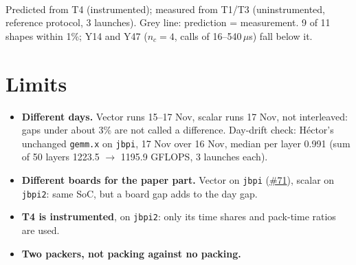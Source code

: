 \documentclass[10pt,a4paper]{article}
\newcommand{\iss}[1]{\href{https://github.com/JieGH/RVV_code_gen_via_MLIR_xDSL/issues/#1}{\##1}}
\begin{document}
\begin{center}
\\
{\footnotesize\color{muted} Predicted from T4 (instrumented); measured from T1/T3 (uninstrumented, reference protocol, 3 launches).
Grey line: prediction = measurement. 9 of 11 shapes within 1\%; Y14 and Y47 ($n_c=4$, calls of 16--540\,$\mu$s) fall below it.}
\end{center}

\section*{Limits}
\begin{itemize}
  \item \textbf{Different days.} Vector runs 15--17 Nov, scalar runs 17 Nov, not interleaved: gaps under about 3\% are
        not called a difference. Day-drift check: H\'ector's unchanged \texttt{gemm.x} on \texttt{jbpi}, 17 Nov over
        16 Nov, median per layer 0.991 (sum of 50 layers 1223.5 $\to$ 1195.9 GFLOPS, 3 launches each).
  \item \textbf{Different boards for the paper part.} Vector on \texttt{jbpi} (\iss{71}), scalar on \texttt{jbpi2}:
        same SoC, but a board gap adds to the day gap.
  \item \textbf{T4 is instrumented}, on \texttt{jbpi2}: only its time shares and pack-time ratios are used.
  \item \textbf{Two packers, not packing against no packing.}
\end{itemize}
\end{document}
